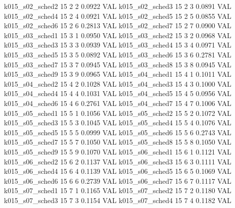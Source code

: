   k015_s02_sched2                   15    2   2    0.0922  VAL
  k015_s02_sched3                   15    2   3    0.0891  VAL
  k015_s02_sched4                   15    2   4    0.0921  VAL
  k015_s02_sched5                   15    2   5    0.0855  VAL
  k015_s02_sched6                   15    2   6    0.2813  VAL
  k015_s02_sched7                   15    2   7    0.0900  VAL
  k015_s03_sched1                   15    3   1    0.0950  VAL
  k015_s03_sched2                   15    3   2    0.0968  VAL
  k015_s03_sched3                   15    3   3    0.0939  VAL
  k015_s03_sched4                   15    3   4    0.0971  VAL
  k015_s03_sched5                   15    3   5    0.0892  VAL
  k015_s03_sched6                   15    3   6    0.2781  VAL
  k015_s03_sched7                   15    3   7    0.0945  VAL
  k015_s03_sched8                   15    3   8    0.0945  VAL
  k015_s03_sched9                   15    3   9    0.0965  VAL
  k015_s04_sched1                   15    4   1    0.1011  VAL
  k015_s04_sched2                   15    4   2    0.1028  VAL
  k015_s04_sched3                   15    4   3    0.1000  VAL
  k015_s04_sched4                   15    4   4    0.1031  VAL
  k015_s04_sched5                   15    4   5    0.0956  VAL
  k015_s04_sched6                   15    4   6    0.2761  VAL
  k015_s04_sched7                   15    4   7    0.1006  VAL
  k015_s05_sched1                   15    5   1    0.1056  VAL
  k015_s05_sched2                   15    5   2    0.1072  VAL
  k015_s05_sched3                   15    5   3    0.1045  VAL
  k015_s05_sched4                   15    5   4    0.1076  VAL
  k015_s05_sched5                   15    5   5    0.0999  VAL
  k015_s05_sched6                   15    5   6    0.2743  VAL
  k015_s05_sched7                   15    5   7    0.1050  VAL
  k015_s05_sched8                   15    5   8    0.1050  VAL
  k015_s05_sched9                   15    5   9    0.1070  VAL
  k015_s06_sched1                   15    6   1    0.1121  VAL
  k015_s06_sched2                   15    6   2    0.1137  VAL
  k015_s06_sched3                   15    6   3    0.1111  VAL
  k015_s06_sched4                   15    6   4    0.1139  VAL
  k015_s06_sched5                   15    6   5    0.1069  VAL
  k015_s06_sched6                   15    6   6    0.2739  VAL
  k015_s06_sched7                   15    6   7    0.1117  VAL
  k015_s07_sched1                   15    7   1    0.1165  VAL
  k015_s07_sched2                   15    7   2    0.1180  VAL
  k015_s07_sched3                   15    7   3    0.1154  VAL
  k015_s07_sched4                   15    7   4    0.1182  VAL

